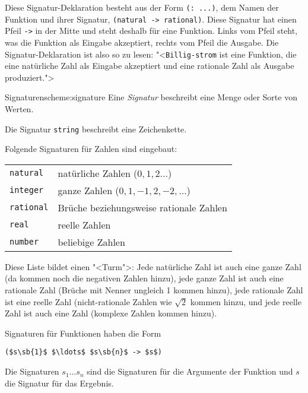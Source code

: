 Diese Signatur-Deklaration besteht aus der Form \lstinline{(: ...)},
dem Namen der Funktion und ihrer Signatur, \lstinline{(natural -> rational)}. 
Diese Signatur hat einen Pfeil \lstinline{->} in der Mitte und steht
deshalb für eine Funktion.  Links vom Pfeil steht, was
die Funktion als Eingabe akzeptiert, rechts vom Pfeil die Ausgabe. Die
Signatur-Deklaration ist also so zu lesen: "<\lstinline{Billig-strom} ist
eine Funktion, die eine natürliche Zahl als Eingabe akzeptiert und
eine rationale Zahl als Ausgabe produziert.">

\begin{feature}{Signaturen}{scheme:signature}
  Eine \textit{Signatur} beschreibt eine Menge oder
  Sorte von Werten.

  \smallskip
  Die Signatur \lstinline{string}
  beschreibt eine Zeichenkette.
  \smallskip
  
  Folgende Signaturen für Zahlen sind eingebaut:
  \begin{flushleft}
    \begin{tabular}{ll}
      {\lstinline!natural!}\index{natural@\texttt{natural}} & natürliche
                                                         Zahlen\index{natürliche
                                                         Zahlen} ($0, 1, 2\ldots$)\\
      {\lstinline!integer!}\index{integer@\texttt{integer}} & ganze
                                                         Zahlen\index{ganze
                                                         Zahlen} ($0, 1, -1, 2, -2, \ldots$)\\
      {\lstinline!rational!}\index{rational@\texttt{rational}} &
                                                            Brüche\index{Bruch} beziehungsweise rationale Zahlen\index{rationale Zahlen} \\
      {\lstinline!real!}\index{real@\texttt{real}} & reelle
                                                Zahlen\index{reelle Zahlen}\\
      {\lstinline!number!}\index{number@\texttt{number}} & beliebige Zahlen
    \end{tabular}
  \end{flushleft}
  Diese Liste bildet einen "<Turm">: Jede natürliche Zahl ist auch eine
  ganze Zahl (da kommen noch die negativen Zahlen hinzu), jede ganze
  Zahl ist auch eine rationale Zahl (Brüche mit Nenner ungleich 1
  kommen hinzu), jede rationale Zahl ist eine reelle Zahl
  (nicht-rationale Zahlen wie $\sqrt{2}$ kommen hinzu, und jede reelle
  Zahl ist auch eine Zahl (komplexe Zahlen kommen hinzu).

\smallskip
  
  Signaturen für Funktionen haben die Form
%
\begin{lstlisting}
($s\sb{1}$ $\ldots$ $s\sb{n}$ -> $s$)
\end{lstlisting}
%
Die Signaturen $s_1 \ldots s_n$ sind die Signaturen für die Argumente
der Funktion und $s$ die Signatur für das Ergebnis.
\end{feature}

